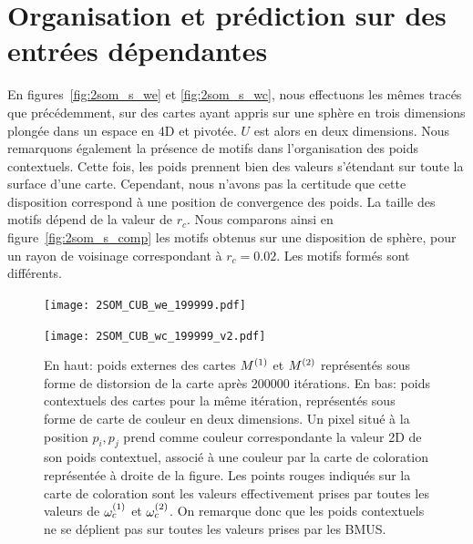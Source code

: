\documentclass[../main]{subfiles}
\begin{document}
\section{Organisation et prédiction sur des entrées dépendantes}

En figures~\ref{fig:2som_s_we} et \ref{fig:2som_s_wc}, nous effectuons les mêmes tracés que précédemment, sur des cartes ayant appris sur une sphère en trois dimensions plongée dans un espace en 4D et pivotée. $U$ est alors en deux dimensions.
Nous remarquons également la présence de motifs dans l'organisation des poids contextuels. Cette fois, les poids prennent bien des valeurs s'étendant sur toute la surface d'une carte.
Cependant, nous n'avons pas la certitude que cette disposition correspond à une position de convergence des poids. 
La taille des motifs dépend de la valeur de $r_c$. Nous comparons ainsi en figure~\ref{fig:2som_s_comp} les motifs obtenus sur une disposition de sphère, pour un rayon de voisinage correspondant à $r_c = 0.02$. Les motifs formés sont différents.



\begin{figure}
	\begin{minipage}{\textwidth}
		\centering\texttt{[image: 2SOM\_CUB\_we\_199999.pdf]}
		\label{fig:2som_cub_we}
	\end{minipage}
	\begin{minipage}{\textwidth}
		\texttt{[image: 2SOM\_CUB\_wc\_199999\_v2.pdf]}
		\caption{En haut: poids externes des cartes $M^{({1})}$ et $M^{({2})}$ représentés sous forme de distorsion de la carte après 200000 itérations.
	En bas: poids contextuels des cartes pour la même itération, représentés sous forme de carte de couleur en deux dimensions. Un pixel situé à la position $p_i,p_j$ prend comme couleur correspondante la valeur 2D de son poids contextuel, associé à une couleur par la carte de coloration représentée à droite de la figure.
	Les points rouges indiqués sur la carte de coloration sont les valeurs effectivement prises par toutes les valeurs de $\omega_c^{(1)}$ et $\omega_c^{(2)}$. On remarque donc que les poids contextuels ne se déplient pas sur toutes les valeurs prises par les BMUS.\label{fig:2som_cub_wc}}
	\end{minipage}
\end{figure}
\end{document}
